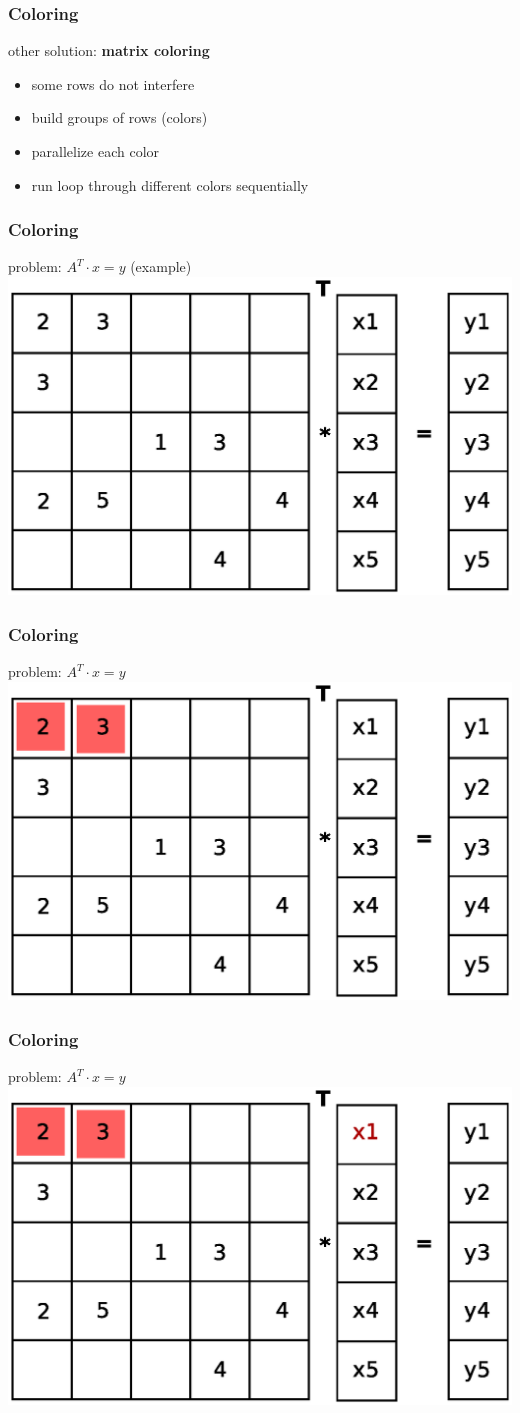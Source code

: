 \documentclass{beamer}
\begin{document}
\begin{frame}
\frametitle{Coloring}
other solution: \textbf{matrix coloring}
\begin{itemize}
\item some rows do not interfere
\item build groups of rows (colors)
\item parallelize each color
\item run loop through different colors sequentially
\end{itemize}
\end{frame}

\begin{frame}
\frametitle{Coloring}
problem: $A^T \cdot x= y$
(example)
\includegraphics[width=0.8\linewidth]{graphic/coloringT1.eps}
\end{frame}

\begin{frame}
\frametitle{Coloring}
problem: $A^T \cdot x= y$
\includegraphics[width=0.8\linewidth]{graphic/coloringT2.eps}
\end{frame}

\begin{frame}
\frametitle{Coloring}
problem: $A^T \cdot x= y$
\includegraphics[width=0.8\linewidth]{graphic/coloringT3.eps}
\end{frame}
\end{document}
